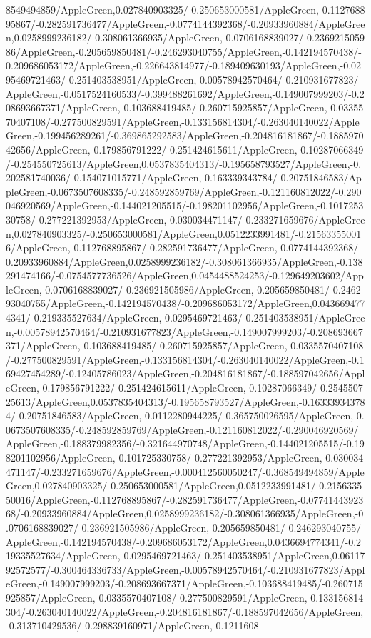 {\begin{tikzternal}
{8549494859/AppleGreen,0.027840903325/-0.250653000581/AppleGreen,-0.112768895867/-0.282591736477/AppleGreen,-0.0774144392368/-0.20933960884/AppleGreen,0.0258999236182/-0.308061366935/AppleGreen,-0.0706168839027/-0.236921505986/AppleGreen,-0.205659850481/-0.246293040755/AppleGreen,-0.142194570438/-0.209686053172/AppleGreen,-0.226643814977/-0.189409630193/AppleGreen,-0.0295469721463/-0.251403538951/AppleGreen,-0.00578942570464/-0.210931677823/AppleGreen,-0.0517524160533/-0.399488261692/AppleGreen,-0.149007999203/-0.208693667371/AppleGreen,-0.103688419485/-0.260715925857/AppleGreen,-0.0335570407108/-0.277500829591/AppleGreen,-0.133156814304/-0.263040140022/AppleGreen,-0.199456289261/-0.369865292583/AppleGreen,-0.204816181867/-0.188597042656/AppleGreen,-0.179856791222/-0.251424615611/AppleGreen,-0.10287066349/-0.254550725613/AppleGreen,0.0537835404313/-0.195658793527/AppleGreen,-0.202581740036/-0.154071015771/AppleGreen,-0.163339343784/-0.20751846583/AppleGreen,-0.0673507608335/-0.248592859769/AppleGreen,-0.121160812022/-0.290046920569/AppleGreen,-0.144021205515/-0.198201102956/AppleGreen,-0.101725330758/-0.277221392953/AppleGreen,-0.030034471147/-0.233271659676/AppleGreen,0.027840903325/-0.250653000581/AppleGreen,0.0512233991481/-0.215633550016/AppleGreen,-0.112768895867/-0.282591736477/AppleGreen,-0.0774144392368/-0.20933960884/AppleGreen,0.0258999236182/-0.308061366935/AppleGreen,-0.138291474166/-0.0754577736526/AppleGreen,0.0454488524253/-0.129649203602/AppleGreen,-0.0706168839027/-0.236921505986/AppleGreen,-0.205659850481/-0.246293040755/AppleGreen,-0.142194570438/-0.209686053172/AppleGreen,0.0436694774341/-0.219335527634/AppleGreen,-0.0295469721463/-0.251403538951/AppleGreen,-0.00578942570464/-0.210931677823/AppleGreen,-0.149007999203/-0.208693667371/AppleGreen,-0.103688419485/-0.260715925857/AppleGreen,-0.0335570407108/-0.277500829591/AppleGreen,-0.133156814304/-0.263040140022/AppleGreen,-0.169427454289/-0.12405786023/AppleGreen,-0.204816181867/-0.188597042656/AppleGreen,-0.179856791222/-0.251424615611/AppleGreen,-0.10287066349/-0.254550725613/AppleGreen,0.0537835404313/-0.195658793527/AppleGreen,-0.163339343784/-0.20751846583/AppleGreen,-0.0112280944225/-0.365750026595/AppleGreen,-0.0673507608335/-0.248592859769/AppleGreen,-0.121160812022/-0.290046920569/AppleGreen,-0.188379982356/-0.321644970748/AppleGreen,-0.144021205515/-0.198201102956/AppleGreen,-0.101725330758/-0.277221392953/AppleGreen,-0.030034471147/-0.233271659676/AppleGreen,-0.000412560050247/-0.368549494859/AppleGreen,0.027840903325/-0.250653000581/AppleGreen,0.0512233991481/-0.215633550016/AppleGreen,-0.112768895867/-0.282591736477/AppleGreen,-0.0774144392368/-0.20933960884/AppleGreen,0.0258999236182/-0.308061366935/AppleGreen,-0.0706168839027/-0.236921505986/AppleGreen,-0.205659850481/-0.246293040755/AppleGreen,-0.142194570438/-0.209686053172/AppleGreen,0.0436694774341/-0.219335527634/AppleGreen,-0.0295469721463/-0.251403538951/AppleGreen,0.0611792572577/-0.300464336733/AppleGreen,-0.00578942570464/-0.210931677823/AppleGreen,-0.149007999203/-0.208693667371/AppleGreen,-0.103688419485/-0.260715925857/AppleGreen,-0.0335570407108/-0.277500829591/AppleGreen,-0.133156814304/-0.263040140022/AppleGreen,-0.204816181867/-0.188597042656/AppleGreen,-0.313710429536/-0.298839160971/AppleGreen,-0.1211608}
\end{tikzternal}}
